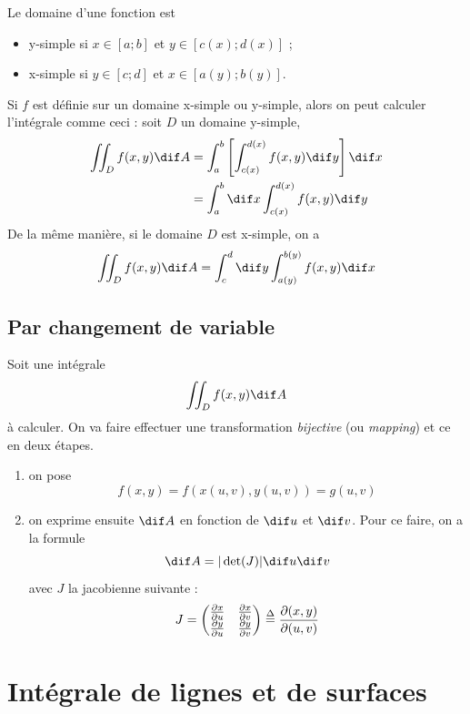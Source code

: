 \begin{mydef}
	Le domaine d'une fonction est
	\begin{itemize}
		\item y-simple si $x \in [a;b]$ et $y \in [c(x);d(x)]$ ;
		\item x-simple si $y \in [c;d]$ et $x \in [a(y);b(y)]$.
	\end{itemize}
\end{mydef}

\begin{myprop} Si $f$ est définie sur un domaine x-simple ou y-simple, alors on peut calculer l'intégrale comme ceci : soit $D$ un domaine y-simple,
	\begin{align*} \iint_D f(x,y)\dif A & = \int_a^b \left[ \int_{c(x)}^{d(x)} f(x,y) \dif y \right] \dif x \\
		& = \int_a^b \dif x \int_{c(x)}^{d(x)} f(x,y) \dif y
	\end{align*}
	De la même manière, si le domaine $D$ est x-simple, on a
	\[ \iint_D f(x,y)\dif A  = \int_c^d \dif y \int_{a(y)}^{b(y)} f(x,y) \dif x \]
\end{myprop}

\subsection{Par changement de variable}
Soit une intégrale
\[ \iint_D f(x,y) \dif A \]
à calculer. On va faire effectuer une transformation \emph{bijective} (ou \emph{mapping}) et ce en deux étapes.
\begin{enumerate}
	\item on pose
		\[ f(x,y) = f(x(u,v),y(u,v)) = g(u,v) \]
	\item on exprime ensuite $\dif A$ en fonction de $\dif u$ et $\dif v$. Pour ce faire, on a la formule
		\[ \dif A = |\newdet(J)| \dif u \dif v \]
		avec $J$ la jacobienne suivante :
		\[ J =
		\begin{pmatrix}
			\frac{\partial x}{\partial u} & \frac{\partial x}{\partial v} \\ \frac{\partial y}{\partial u} & \frac{\partial y}{\partial v}
		\end{pmatrix}
		\overset{\Delta}{=} \frac{\partial(x,y)}{\partial (u,v)} \]
\end{enumerate}

\section{Intégrale de lignes et de surfaces}

